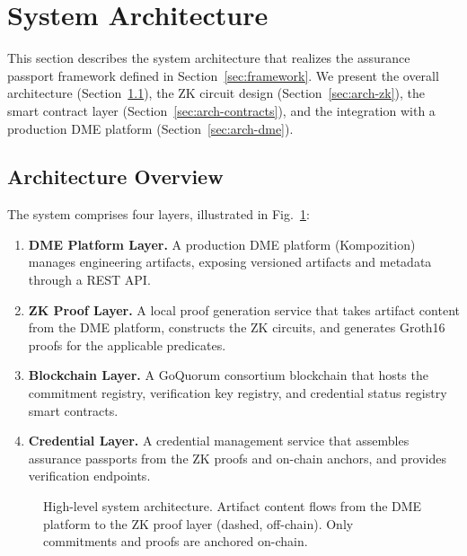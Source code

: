 \section{System Architecture}
\label{sec:architecture}

This section describes the system architecture that realizes the assurance passport framework defined in Section~\ref{sec:framework}.
We present the overall architecture (Section~\ref{sec:arch-overview}), the ZK circuit design (Section~\ref{sec:arch-zk}), the smart contract layer (Section~\ref{sec:arch-contracts}), and the integration with a production DME platform (Section~\ref{sec:arch-dme}).

\subsection{Architecture Overview}
\label{sec:arch-overview}

The system comprises four layers, illustrated in Fig.~\ref{fig:architecture}:

\begin{enumerate}
    \item \textbf{DME Platform Layer.} A production DME platform (Kompozition) manages engineering artifacts, exposing versioned artifacts and metadata through a REST API.
    \item \textbf{ZK Proof Layer.} A local proof generation service that takes artifact content from the DME platform, constructs the ZK circuits, and generates Groth16 proofs for the applicable predicates.
    \item \textbf{Blockchain Layer.} A GoQuorum consortium blockchain that hosts the commitment registry, verification key registry, and credential status registry smart contracts.
    \item \textbf{Credential Layer.} A credential management service that assembles assurance passports from the ZK proofs and on-chain anchors, and provides verification endpoints.
\end{enumerate}

\begin{figure}[t]
\centering
{}
\caption{High-level system architecture. Artifact content flows from the DME platform to the ZK proof layer (dashed, off-chain). Only commitments and proofs are anchored on-chain.}
\label{fig:architecture}
\end{figure}

